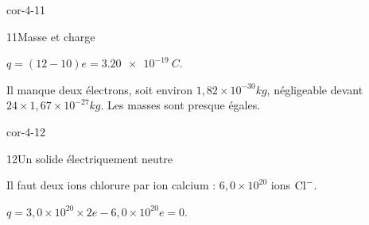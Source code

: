 \begin{blocLivre}{cor-4-11}\begin{corrige}{11}{Masse et charge}
\begin{questions}
\item $q=(12-10)e=\qty{3,20e-19}{C}$.
\item Il manque deux électrons, soit environ $1,82\times10^{-30}\unit{kg}$, négligeable devant $24\times1,67\times10^{-27}\unit{kg}$. Les masses sont presque égales.
\end{questions}
\end{corrige}\end{blocLivre}
\begin{blocLivre}{cor-4-12}\begin{corrige}{12}{Un solide électriquement neutre}
\begin{questions}
\item Il faut deux ions chlorure par ion calcium : $6,0\times10^{20}$ ions $\ce{Cl-}$.
\item $q=3,0\times10^{20}\times2e-6,0\times10^{20}e=0$.
\end{questions}
\end{corrige}\end{blocLivre}

